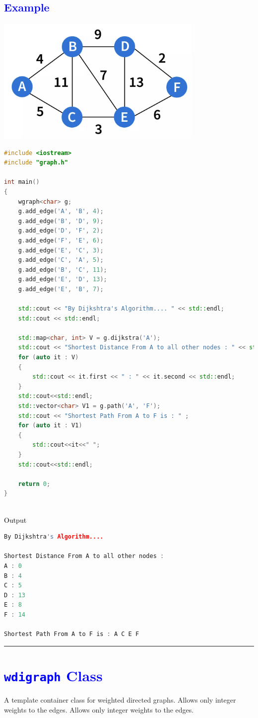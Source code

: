 \documentclass[11pt,a4paper]{article}
\begin{document}
\subsection*{\textcolor{blue}{\Large Example }}
\includegraphics[width=100mm]{example7.png}
\begin{lstlisting}[language=C++]
#include <iostream>
#include "graph.h"

int main()
{
    wgraph<char> g;
    g.add_edge('A', 'B', 4);
    g.add_edge('B', 'D', 9);
    g.add_edge('D', 'F', 2);
    g.add_edge('F', 'E', 6);
    g.add_edge('E', 'C', 3);
    g.add_edge('C', 'A', 5);
    g.add_edge('B', 'C', 11);
    g.add_edge('E', 'D', 13);
    g.add_edge('E', 'B', 7);

    std::cout << "By Dijkshtra's Algorithm.... " << std::endl;
    std::cout << std::endl;

    std::map<char, int> V = g.dijkstra('A');
    std::cout << "Shortest Distance From A to all other nodes : " << std::endl;
    for (auto it : V)
    {
        std::cout << it.first << " : " << it.second << std::endl;
    }
    std::cout<<std::endl;
    std::vector<char> V1 = g.path('A', 'F');
    std::cout << "Shortest Path From A to F is : " ;
    for (auto it : V1)
    {
        std::cout<<it<<" ";
    }
    std::cout<<std::endl;

    return 0;
}

\end{lstlisting}
\\
{\textcolor{black}{\normalsize Output }}
\begin{lstlisting}[language=C++]
By Dijkshtra's Algorithm.... 

Shortest Distance From A to all other nodes :
A : 0
B : 4
C : 5
D : 13
E : 8
F : 14

Shortest Path From A to F is : A C E F
\end{lstlisting}
\rule{17cm}{0.1mm}
\section*{\textcolor{blue}{{\huge \texttt{wdigraph} Class}} }
A template container class for weighted directed graphs. Allows only integer weights to the edges. Allows only integer weights to the edges.
\end{document}
